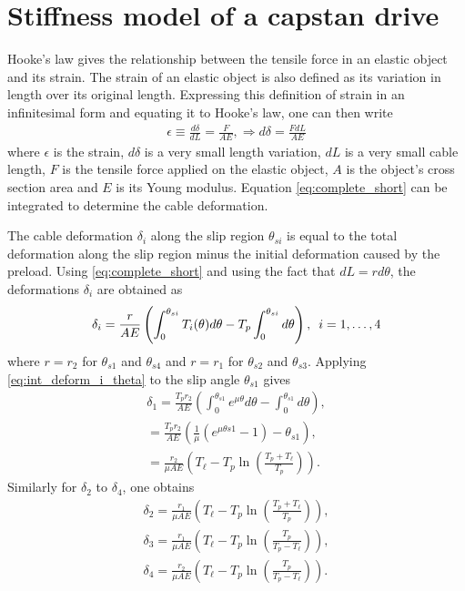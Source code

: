 \documentclass[10pt,cleanfoot]{asme2ej}
\newcommand{\hquad}{\hspace{0.5em}}
\begin{document}
\section{Stiffness model of a capstan drive}
Hooke's law gives the relationship between the tensile force in an elastic object and its strain. The strain of an elastic object is also defined as its variation in length over its original length. Expressing this definition of strain in an infinitesimal form and equating it to Hooke's law, one can then write
\begin{align}
\epsilon \equiv \frac{d\delta}{dL} = \frac{F}{AE}, \Rightarrow d\delta = \frac{FdL}{AE}
\label{eq:complete_short}
\end{align}
where $\epsilon$ is the strain, $d\delta$ is a very small length variation, $dL$ is a very small cable length, $F$ is the tensile force applied on the elastic object, $A$ is the object's  cross section area and $E$ is its Young modulus. Equation \eqref{eq:complete_short} can be integrated to determine the cable deformation.
\par
The  cable deformation $\delta_i$ along the slip region $\theta_{si}$ is equal to the total deformation along the slip region minus the initial deformation caused by the preload.  Using \eqref{eq:complete_short} and using the fact that $dL=rd\theta$, the deformations $\delta_i$ are obtained as 
\begin{align}
    \delta_i = \frac{r}{AE}\left(\int_0^{\theta_{si}}T_i(\theta)d\theta-T_p\int_0^{\theta_{si}}d\theta\right),\hquad i=1,\ldots ,4 \label{eq:int_deform_i_theta}
\end{align}
where $r = r_2$ for $\theta_{s1}$ and $\theta_{s4}$ and $r = r_1$ for $\theta_{s2}$ and $\theta_{s3}$.
Applying \eqref{eq:int_deform_i_theta} to the slip angle $\theta_{s1}$ gives
\begin{align}
    \delta_1 = \frac{T_pr_2}{AE}\left(\int_0^{\theta_{s1}}e^{\mu\theta} d\theta-\int_0^{\theta_{s1}}d\theta\right), \\
    = \frac{T_pr_2}{AE}\left(\frac{1}{\mu}\left(e^{\mu\theta{s1}} -1\right)-\theta_{s1}\right),\\
    =\frac{r_2}{\mu AE}\left(T_\ell-T_p\ln\left(\frac{T_p+T_\ell}{T_p}\right)\right)\label{eq:defo1}.
\end{align}
Similarly for $\delta_2$ to $\delta_4$, one obtains 
\begin{align}
    \delta_2=\frac{r_1}{\mu AE}\left(T_\ell-T_p\ln\left(\frac{T_p+T_\ell}{T_p}\right)\right),\label{eq:defo2}\\
    \delta_3= \frac{r_1}{\mu AE}\left(T_\ell-T_p\ln\left(\frac{T_p}{T_p-T_\ell}\right)\right),\label{eq:defo3}\\
    \delta_4 =\frac{r_2}{\mu AE}\left(T_\ell-T_p\ln\left(\frac{T_p}{T_p-T_\ell}\right)\right).\label{eq:defo4}
\end{align}
\end{document}
